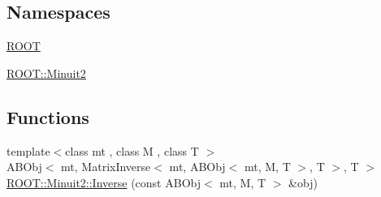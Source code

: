 \subsection*{Namespaces}
\begin{DoxyCompactItemize}
\item 
 \mbox{\hyperlink{namespaceROOT}{R\+O\+OT}}
\item 
 \mbox{\hyperlink{namespaceROOT_1_1Minuit2}{R\+O\+O\+T\+::\+Minuit2}}
\end{DoxyCompactItemize}
\subsection*{Functions}
\begin{DoxyCompactItemize}
\item 
{\footnotesize template$<$class mt , class M , class T $>$ }\\A\+B\+Obj$<$ mt, Matrix\+Inverse$<$ mt, A\+B\+Obj$<$ mt, M, T $>$, T $>$, T $>$ \mbox{\hyperlink{namespaceROOT_1_1Minuit2_a47a8185dbf2f2978dedb44abf3ab2e68}{R\+O\+O\+T\+::\+Minuit2\+::\+Inverse}} (const A\+B\+Obj$<$ mt, M, T $>$ \&obj)
\end{DoxyCompactItemize}
